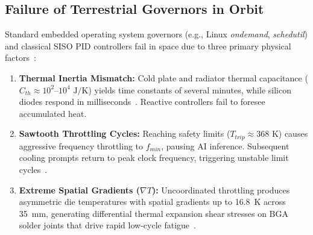 \documentclass[journal]{IEEEtran}
\begin{document}
\subsection{Failure of Terrestrial Governors in Orbit}
Standard embedded operating system governors (e.g., Linux \textit{ondemand}, \textit{schedutil}) and classical SISO PID controllers fail in space due to three primary physical factors~\cite{brooks2001dtm, skadron2004hotspot, hoffmann2021online}:
\begin{enumerate}
    \item \textbf{Thermal Inertia Mismatch:} Cold plate and radiator thermal capacitance ($C_{th} \approx 10^2\text{--}10^4\text{ J/K}$) yields time constants of several minutes, while silicon diodes respond in milliseconds~\cite{skadron2004hotspot}. Reactive controllers fail to foresee accumulated heat.
    \item \textbf{Sawtooth Throttling Cycles:} Reaching safety limits ($T_{trip} \approx 368\text{ K}$) causes aggressive frequency throttling to $f_{min}$, pausing AI inference. Subsequent cooling prompts return to peak clock frequency, triggering unstable limit cycles~\cite{brooks2001dtm, yuan2025heat}.
    \item \textbf{Extreme Spatial Gradients ($\nabla T$):} Uncoordinated throttling produces asymmetric die temperatures with spatial gradients up to 16.8~K across 35~mm, generating differential thermal expansion shear stresses on BGA solder joints that drive rapid low-cycle fatigue~\cite{manson1966fatigue, ecss2008thermal}.
\end{enumerate}
\end{document}
